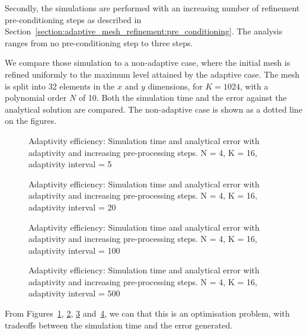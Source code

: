 Secondly, the simulations are performed with an increasing number of refinement pre-conditioning
steps as described in Section~\ref{section:adaptive_mesh_refinement:pre_conditioning}. The analysis
ranges from no pre-conditioning step to three steps.

We compare those simulation to a non-adaptive case, where the initial mesh is refined uniformly to
the maximum level attained by the adaptive case. The mesh is split into 32 elements in the $x$ and
$y$ dimensions, for $K = 1024$, with a polynomial order $N$ of 10. Both the simulation time and the
error against the analytical solution are compared. The non-adaptive case is shown as a dotted line
on the figures.

\begin{figure}[H]
	\centering
	
	\caption{Adaptivity efficiency: Simulation time and analytical error with adaptivity and increasing pre-processing steps. N = 4, K = 16, adaptivity interval = 5}
	\label{fig:adaptivity_efficiency_C5}
\end{figure}

\begin{figure}[H]
	\centering
	
	\caption{Adaptivity efficiency: Simulation time and analytical error with adaptivity and increasing pre-processing steps. N = 4, K = 16, adaptivity interval = 20}
	\label{fig:adaptivity_efficiency_C20}
\end{figure}

\begin{figure}[H]
	\centering
	
	\caption{Adaptivity efficiency: Simulation time and analytical error with adaptivity and increasing pre-processing steps. N = 4, K = 16, adaptivity interval = 100}
	\label{fig:adaptivity_efficiency_C100}
\end{figure}

\begin{figure}[H]
	\centering
	
	\caption{Adaptivity efficiency: Simulation time and analytical error with adaptivity and increasing pre-processing steps. N = 4, K = 16, adaptivity interval = 500}
	\label{fig:adaptivity_efficiency_C500}
\end{figure}

From Figures~\ref{fig:adaptivity_efficiency_C5}, \ref{fig:adaptivity_efficiency_C20},
\ref{fig:adaptivity_efficiency_C100} and~\ref{fig:adaptivity_efficiency_C500}, we can that this is
an optimisation problem, with tradeoffs between the simulation time and the error generated.

